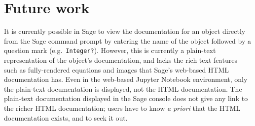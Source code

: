 {\hypertarget{future-work}{%
\section{Future work}\label{future-work}}

It is currently possible in Sage to view the documentation for an object
directly from the Sage command prompt by entering the name of the object
followed by a question mark (e.g.~{\tt Integer?}).  However, this is currently
a plain-text representation of the object's documentation, and lacks the rich
text features such as fully-rendered equations and images that Sage's web-based
HTML documentation has.  Even in the web-based Jupyter Notebook environment,
only the plain-text documentation is displayed, not the HTML documentation.
The plain-text documentation displayed in the Sage console does not give any
link to the richer HTML documentation; users have to know {\em a priori} that
the HTML documentation exists, and to seek it out.

}
